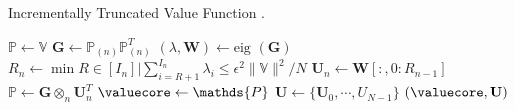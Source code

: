 \begin{savenotes}
	\begin{algorithm}[tb!]
		\caption{Incrementally Truncated Value Function\cite{TuckerMPI}
			.}
		\label{alg:st-hosvd}
		\begin{algorithmic}[1]
			\State $\mathds{P} \leftarrow \mathds{V}$ 
			\State$\mathbf{G} \leftarrow \mathds{P}_{(n)} \mathds{P}_{(n)}^T$
			\State$(\lambda, \mathbf{W}) \leftarrow \text{eig } (\mathbf{G})$
			\State $R_{n} \leftarrow \min { R \in \left[ I_{n} \right] | \sum_{i=R+1}^{I_n} \lambda_i \le \epsilon^2 \|\mathds{V}\|^2 / N }$
			\State $\mathbf{U}_n \leftarrow \mathbf{W}\left[:,0:R_{n-1}\right]$
			\State $\mathds{P} \leftarrow \mathbf{G} \otimes_n \mathbf{U}_n^T$
			\EndFor
			\State $\valuecore \leftarrow \mathds{P}$ 
			\State $\mathbf{U} \leftarrow \{\mathbf{U}_0, \cdots, U_{N-1} \}$
			\State \Return $(\valuecore, \mathbf{U})$
			\EndFunction
		\end{algorithmic}
	\end{algorithm}
\end{savenotes}



